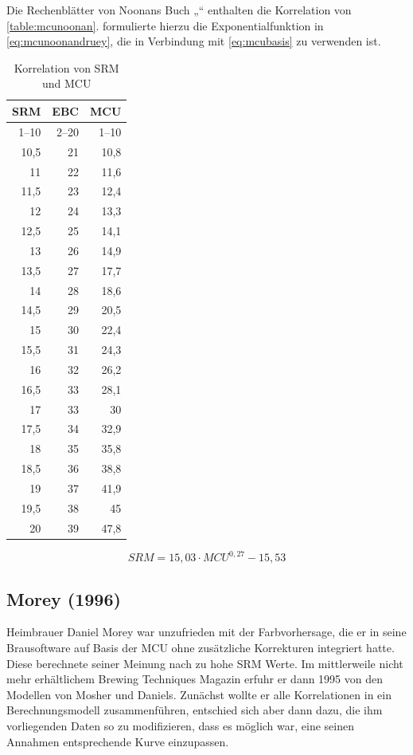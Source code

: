 \documentclass[a4paper,parskip=half]{scrartcl}
\newcommand{\MCUL}{\mathit{MCU}}
\newcommand{\SRM}{\mathit{SRM}}
\begin{document}
Die Rechenblätter von Noonans Buch „“ enthalten die Korrelation von \autoref{table:mcunoonan}. \textcite{Druey1998} formulierte hierzu die Exponentialfunktion in \autoref{eq:mcunoonandruey}, die in Verbindung mit \autoref{eq:mcubasis} zu verwenden ist.

\begin{table}[H]
\centering
\begin{tabular}{rrr}
\toprule
\multicolumn{1}{c}{\textbf{SRM}} & \multicolumn{1}{c}{\textbf{EBC}} & \multicolumn{1}{c}{\textbf{MCU}} \\
\midrule
1–10 & 2–20 & 1–10 \\
10,5 & 21 & 10,8 \\
11   & 22 & 11,6 \\
11,5 & 23 & 12,4 \\
12   & 24 & 13,3 \\
12,5 & 25 & 14,1 \\
13   & 26 & 14,9 \\
13,5 & 27 & 17,7 \\
14   & 28 & 18,6 \\
14,5 & 29 & 20,5 \\
15   & 30 & 22,4 \\
15,5 & 31 & 24,3 \\
16   & 32 & 26,2 \\
16,5 & 33 & 28,1 \\
17   & 33 & 30 \\
17,5 & 34 & 32,9 \\
18   & 35 & 35,8 \\
18,5 & 36 & 38,8 \\
19   & 37 & 41,9 \\
19,5 & 38 & 45 \\
20   & 39 & 47,8 \\
\bottomrule
\end{tabular}
\caption{Korrelation von SRM und MCU \parencite[206]{Noonan1996}}
\label{table:mcunoonan}
\end{table}

\begin{equation}
\SRM = 15,03 \cdot \MCUL^{0,27} - 15,53
\label{eq:mcunoonandruey}
\end{equation}

\subsection*{Morey (1996)}

Heimbrauer Daniel Morey war unzufrieden mit der Farbvorhersage, die er in seine Brausoftware auf Basis der MCU ohne zusätzliche Korrekturen integriert hatte. Diese berechnete seiner Meinung nach zu hohe SRM Werte. Im mittlerweile nicht mehr erhältlichem Brewing Techniques Magazin erfuhr er dann 1995 von den Modellen von  Mosher und Daniels. Zunächst wollte er alle Korrelationen in ein Berechnungsmodell zusammenführen, entschied sich aber dann dazu, die ihm vorliegenden Daten so zu modifizieren, dass es möglich war, eine seinen Annahmen entsprechende Kurve einzupassen. \parencite{Smith2010}
\end{document}
